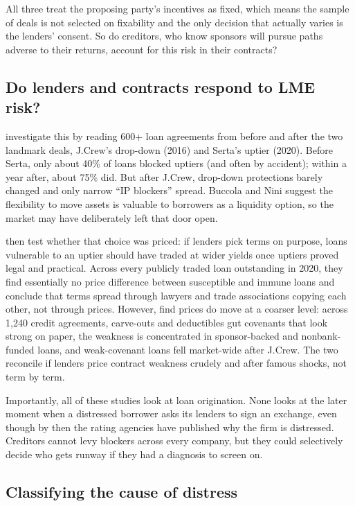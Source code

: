 \documentclass[12pt]{article}
\begin{document}
All three treat the proposing party's incentives as fixed, which means the sample of deals is not selected on fixability and the only decision that actually varies is the lenders' consent. So do creditors, who know sponsors will pursue paths adverse to their returns, account for this risk in their contracts?

\subsection{Do lenders and contracts respond to LME risk?}

\citet{buccolanini2024} investigate this by reading 600+ loan agreements from before and after the two landmark deals, J.Crew's drop-down (2016) and Serta's uptier (2020). Before Serta, only about 40\% of loans blocked uptiers (and often by accident); within a year after, about 75\% did. But after J.Crew, drop-down protections barely changed and only narrow ``IP blockers'' spread. Buccola and Nini suggest the flexibility to move assets is valuable to borrowers as a liquidity option, so the market may have deliberately left that door open.

\citet{badawi2024} then test whether that choice was priced: if lenders pick terms on purpose, loans vulnerable to an uptier should have traded at wider yields once uptiers proved legal and practical. Across every publicly traded loan outstanding in 2020, they find essentially no price difference between susceptible and immune loans and conclude that terms spread through lawyers and trade associations copying each other, not through prices. However, \citet{ivashina2025} find prices do move at a coarser level: across 1,240 credit agreements, carve-outs and deductibles gut covenants that look strong on paper, the weakness is concentrated in sponsor-backed and nonbank-funded loans, and weak-covenant loans fell market-wide after J.Crew. The two reconcile if lenders price contract weakness crudely and after famous shocks, not term by term.

Importantly, all of these studies look at loan origination. None looks at the later moment when a distressed borrower asks its lenders to sign an exchange, even though by then the rating agencies have published why the firm is distressed. Creditors cannot levy blockers across every company, but they could selectively decide who gets runway if they had a diagnosis to screen on.

\subsection{Classifying the cause of distress}
\end{document}
